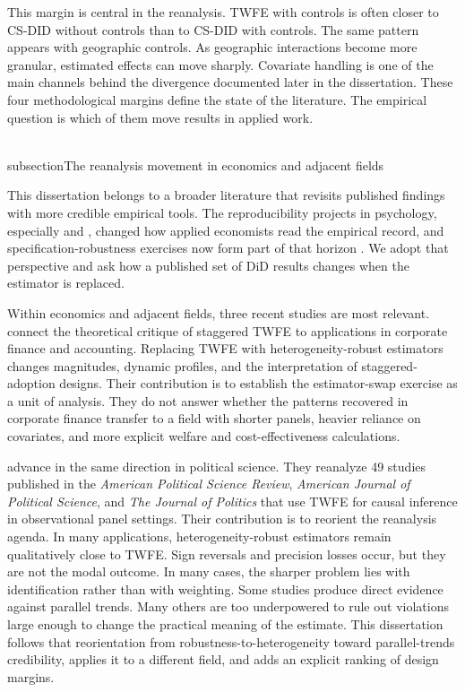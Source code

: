 \documentclass[11pt]{article}
\begin{document}
This margin is central in the reanalysis. TWFE with controls is often closer to CS-DID without controls than to CS-DID with controls. The same pattern appears with geographic controls. As geographic interactions become more granular, estimated effects can move sharply. Covariate handling is one of the main channels behind the divergence documented later in the dissertation. These four methodological margins define the state of the literature. The empirical question is which of them move results in applied work.

\\subsection{The reanalysis movement in economics and adjacent fields}

This dissertation belongs to a broader literature that revisits published findings with more credible empirical tools. The reproducibility projects in psychology, especially \textcite{openscience2015reproducibility} and \textcite{camerer2018evaluating}, changed how applied economists read the empirical record, and specification-robustness exercises now form part of that horizon \parencite{vivalt2020specification}. We adopt that perspective and ask how a published set of DiD results changes when the estimator is replaced.

Within economics and adjacent fields, three recent studies are most relevant. \textcite{baker2022much} connect the theoretical critique of staggered TWFE to applications in corporate finance and accounting. Replacing TWFE with heterogeneity-robust estimators changes magnitudes, dynamic profiles, and the interpretation of staggered-adoption designs. Their contribution is to establish the estimator-swap exercise as a unit of analysis. They do not answer whether the patterns recovered in corporate finance transfer to a field with shorter panels, heavier reliance on covariates, and more explicit welfare and cost-effectiveness calculations.

\textcite{chiu2026causal} advance in the same direction in political science. They reanalyze 49 studies published in the \emph{American Political Science Review}, \emph{American Journal of Political Science}, and \emph{The Journal of Politics} that use TWFE for causal inference in observational panel settings. Their contribution is to reorient the reanalysis agenda. In many applications, heterogeneity-robust estimators remain qualitatively close to TWFE. Sign reversals and precision losses occur, but they are not the modal outcome. In many cases, the sharper problem lies with identification rather than with weighting. Some studies produce direct evidence against parallel trends. Many others are too underpowered to rule out violations large enough to change the practical meaning of the estimate. This dissertation follows that reorientation from robustness-to-heterogeneity toward parallel-trends credibility, applies it to a different field, and adds an explicit ranking of design margins.
\end{document}
